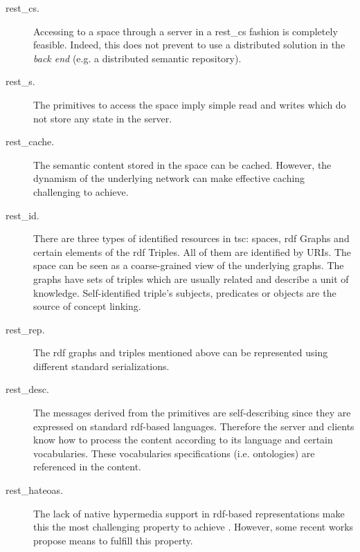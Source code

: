 \begin{description}
 \item[\ac{rest_cs}.] Accessing to a space through a server in a \ac{rest_cs} fashion is completely feasible.
		      Indeed, this does not prevent to use a distributed solution in the \emph{back end} (e.g. a distributed semantic repository).
 \item[\ac{rest_s}.] The primitives to access the space imply simple read and writes which do not store any state in the server.
 \item[\ac{rest_cache}. ] The semantic content stored in the space can be cached.
                          However, the dynamism of the underlying network can make effective caching challenging to achieve. %
	\item[\ac{rest_id}.] There are three types of identified resources in \ac{tsc}: spaces, \ac{rdf} Graphs and certain elements of the \ac{rdf} Triples.
	                 All of them are identified by URIs.
	                 The space can be seen as a coarse-grained view of the underlying graphs.
	                 The graphs have sets of triples which are usually related and describe a unit of knowledge. %
	                 Self-identified triple's subjects, predicates or objects are the source of concept linking.
	\item[\ac{rest_rep}.] The \ac{rdf} graphs and triples mentioned above can be represented using different standard serializations.
	\item[\ac{rest_desc}.] The messages derived from the primitives are self-describing since they are expressed on standard \ac{rdf}-based languages. %
				Therefore the server and clients know how to process the content according to its language and certain vocabularies.
				These vocabularies specifications (i.e. ontologies) are referenced in the content.
	\item[\ac{rest_hateoas}.] The lack of native hypermedia support in \ac{rdf}-based representations make this the most challenging property to achieve \citep{page_rest_2011}. %
				  However, some recent works propose means to fulfill this property.

\end{description}
